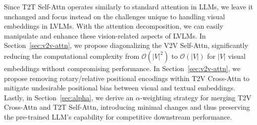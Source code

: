 


Since T2T Self-Attn operates similarly to standard attention in LLMs, we leave it unchanged and focus instead on the challenges unique to handling visual embeddings in LVLMs.
With the attention decomposition, we can easily manipulate and enhance these vision-related aspects of LVLMs.
In Section~\ref{sec:v2v-attn}, we propose diagonalizing the V2V Self-Attn, significantly reducing the computational complexity from $\mathcal{O}(|V|^2)$ to $\mathcal{O}(|V|)$ for $|V|$ visual embeddings without compromising performance.
In Section~\ref{sec:v2v-attn}, we propose removing rotary/relative positional encodings within T2V Cross-Attn to mitigate undesirable positional bias between visual and textual embeddings.
Lastly, in Section~\ref{sec:alpha}, we derive an $\alpha$-weighting strategy for merging T2V Cross-Attn and T2T Self-Attn, introducing minimal changes and thus preserving the pre-trained LLM's capability for competitive downstream performance.

